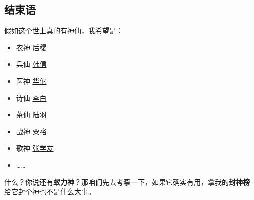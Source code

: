 \subsection{结束语}

假如这个世上真的有神仙，我希望是：

\begin{itemize}[nosep, left=\parindent]
    \item 农神 \href{https://baike.baidu.com/item/后稷}{后稷}
    \item 兵仙 \href{https://baike.baidu.com/item/韩信}{韩信}
    \item 医神 \href{https://baike.baidu.com/item/华佗}{华佗}
    \item 诗仙 \href{https://baike.baidu.com/item/李白}{李白}
    \item 茶仙 \href{https://baike.baidu.com/item/陆羽}{陆羽}
    \item 战神 \href{https://baike.baidu.com/item/粟裕}{粟裕}
    \item 歌神 \href{https://baike.baidu.com/item/张学友}{张学友}
    \item ……
\end{itemize}

什么？你说还有\textbf{蚁力神}？那咱们先去考察一下，如果它确实有用，拿我的\textbf{封神榜} 给它封个神也不是什么大事。

